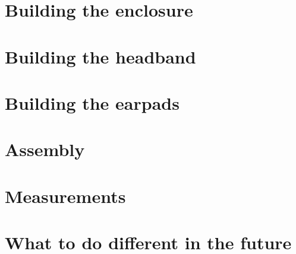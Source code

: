 \documentclass{article}
\begin{document}
\section{Building the enclosure}
\label{s:enclosure}

\section{Building the headband}
\label{s:headband}

\section{Building the earpads}
\label{s:pads}

\section{Assembly}
\label{s:assembly}

\section{Measurements}
\label{s:measurements}

\section{What to do different in the future}
\label{s:future}



\end{document}
